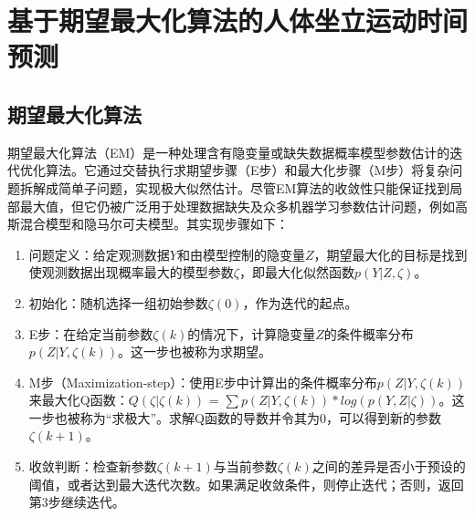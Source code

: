 \section{基于期望最大化算法的人体坐立运动时间预测}
\subsection{期望最大化算法}
期望最大化算法（EM）是一种处理含有隐变量或缺失数据概率模型参数估计的迭代优化算法。它通过交替执行求期望步骤（E步）和最大化步骤（M步）将复杂问题拆解成简单子问题，实现极大似然估计。尽管EM算法的收敛性只能保证找到局部最大值，但它仍被广泛用于处理数据缺失及众多机器学习参数估计问题，例如高斯混合模型和隐马尔可夫模型。其实现步骤如下：

\begin{enumerate}
\item 问题定义：给定观测数据$Y$和由模型控制的隐变量$Z$，期望最大化的目标是找到使观测数据出现概率最大的模型参数$\zeta $，即最大化似然函数$p(Y|Z, \zeta)$。

\item 初始化：随机选择一组初始参数$\zeta(0)$，作为迭代的起点。

\item E步：在给定当前参数$\zeta(k)$的情况下，计算隐变量$Z$的条件概率分布$p(Z|Y, \zeta(k))$。这一步也被称为求期望。

\item M步（Maximization-step）：使用E步中计算出的条件概率分布$p(Z|Y, \zeta(k))$来最大化Q函数：$Q(\zeta|\zeta(k))$ = $\sum p(Z|Y, \zeta(k)) * log(p(Y, Z|\zeta))$。这一步也被称为``求极大''。求解Q函数的导数并令其为0，可以得到新的参数$\zeta(k+1)$。

\item 收敛判断：检查新参数$\zeta(k+1)$与当前参数$\zeta(k)$之间的差异是否小于预设的阈值，或者达到最大迭代次数。如果满足收敛条件，则停止迭代；否则，返回第3步继续迭代。
\end{enumerate}


